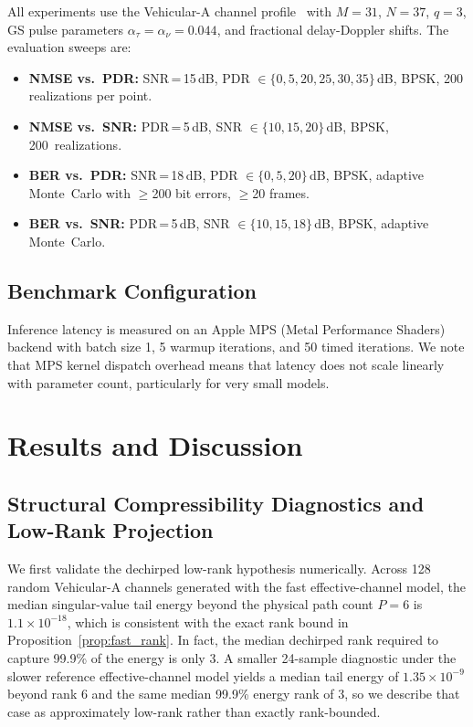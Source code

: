 \documentclass[conference]{IEEEtran}
\begin{document}
All experiments use the Vehicular-A channel profile~\cite{veha_channel} with $M = 31$, $N = 37$, $q = 3$, GS pulse parameters $\alpha_\tau = \alpha_\nu = 0.044$, and fractional delay-Doppler shifts. The evaluation sweeps are:
\begin{itemize}
    \item \textbf{NMSE vs.\ PDR:} SNR\,=\,15\,dB, PDR ${\in}\{0,5,20,25,30,35\}$\,dB, BPSK, 200 realizations per point.
    \item \textbf{NMSE vs.\ SNR:} PDR\,=\,5\,dB, SNR ${\in}\{10,15,20\}$\,dB, BPSK, 200~realizations.
    \item \textbf{BER vs.\ PDR:} SNR\,=\,18\,dB, PDR ${\in}\{0,5,20\}$\,dB, BPSK, adaptive Monte~Carlo with $\geq$200 bit errors, $\geq$20 frames.
    \item \textbf{BER vs.\ SNR:} PDR\,=\,5\,dB, SNR ${\in}\{10,15,18\}$\,dB, BPSK, adaptive Monte~Carlo.
\end{itemize}

\subsection{Benchmark Configuration}

Inference latency is measured on an Apple MPS (Metal Performance Shaders) backend with batch size 1, 5 warmup iterations, and 50 timed iterations. We note that MPS kernel dispatch overhead means that latency does not scale linearly with parameter count, particularly for very small models.

\section{Results and Discussion}
\label{sec:results}

\subsection{Structural Compressibility Diagnostics and Low-Rank Projection}

We first validate the dechirped low-rank hypothesis numerically. Across 128 random Vehicular-A channels generated with the fast effective-channel model, the median singular-value tail energy beyond the physical path count $P=6$ is $1.1 \times 10^{-18}$, which is consistent with the exact rank bound in Proposition~\ref{prop:fast_rank}. In fact, the median dechirped rank required to capture 99.9\% of the energy is only 3. A smaller 24-sample diagnostic under the slower reference effective-channel model yields a median tail energy of $1.35 \times 10^{-9}$ beyond rank 6 and the same median 99.9\% energy rank of 3, so we describe that case as approximately low-rank rather than exactly rank-bounded.
\end{document}
